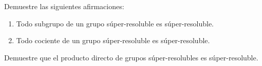 \begin{exercise}
	\label{xca:super}
	Demuestre las siguientes afirmaciones:
	\begin{enumerate}
		\item Todo subgrupo de un grupo súper-resoluble es súper-resoluble.
		\item Todo cociente de un grupo súper-resoluble es súper-resoluble.
	\end{enumerate}
\end{exercise}


\begin{exercise}
	\label{exercise:directosuper}
	Demuestre que el producto directo de grupos súper-resolubles es
	súper-resoluble.
\end{exercise}

